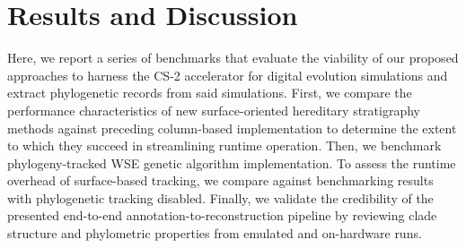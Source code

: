 \section{Results and Discussion} \label{sec:results}

Here, we report a series of benchmarks that evaluate the viability of our proposed approaches to harness the CS-2 accelerator for digital evolution simulations and extract phylogenetic records from said simulations.
First, we compare the performance characteristics of new surface-oriented hereditary stratigraphy methods against preceding column-based implementation to determine the extent to which they succeed in streamlining runtime operation.
Then, we benchmark phylogeny-tracked WSE genetic algorithm implementation.
To assess the runtime overhead of surface-based tracking, we compare against benchmarking results with phylogenetic tracking disabled.
Finally, we validate the credibility of the presented end-to-end annotation-to-reconstruction pipeline by reviewing clade structure and phylometric properties from emulated and on-hardware runs.


% 



